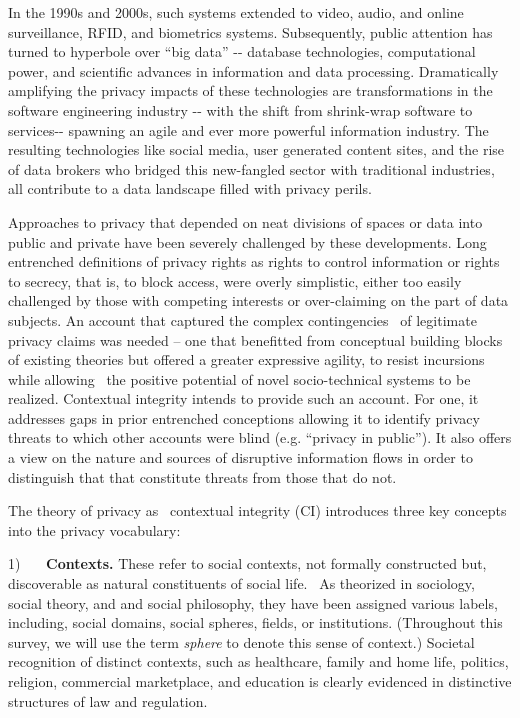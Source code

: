 \documentclass[../thesis.tex]{subfiles}
\begin{document}
In the 1990s and 2000s, such systems extended to video, audio, and
online surveillance, RFID, and biometrics systems. Subsequently, public
attention has turned to hyperbole over ``big
data'' -{}- database technologies, computational
power, and scientific advances in information and data processing.
Dramatically amplifying the privacy impacts of these technologies are
transformations in the software engineering industry -{}- with the
shift from shrink-wrap software to services-{}- spawning an agile and
ever more powerful information industry. The resulting technologies
like social media, user generated content sites, and the rise of data
brokers who bridged this new-fangled sector with traditional
industries, all contribute to a data landscape filled with privacy
perils. 

Approaches to privacy that depended on neat divisions of spaces or data
into public and private have been severely challenged by these
developments. Long entrenched definitions of privacy rights as rights
to control information or rights to secrecy, that is, to block access,
were overly simplistic, either too easily challenged by those with
competing interests or over-claiming on the part of data subjects. An
account that captured the complex contingencies \ of legitimate privacy
claims was needed -- one that benefitted from conceptual building
blocks of existing theories but offered a greater expressive agility,
to resist incursions while allowing \ the positive potential of novel
socio-technical systems to be realized. Contextual integrity intends to
provide such an account. For one, it addresses gaps in prior entrenched
conceptions allowing it to identify privacy threats to which other
accounts were blind (e.g. ``privacy in
public''). It also offers a view on the nature and
sources of disruptive information flows in order to distinguish that
that constitute threats from those that do not. 

The theory of privacy as \ contextual integrity (CI) introduces three
key concepts into the privacy vocabulary:

1) \ \ \ \textbf{Contexts.} These refer to social contexts, not formally
constructed but, discoverable as natural constituents of social life.
\ As theorized in sociology, social theory, and and social philosophy,
they have been assigned various labels, including, social domains,
social spheres, fields, or institutions. (Throughout this survey, we
will use the term \textit{sphere} to denote this sense of context.)
Societal recognition of distinct contexts, such as healthcare, family
and home life, politics, religion, commercial marketplace, and
education is clearly evidenced in distinctive structures of law and
regulation. 
\end{document}
